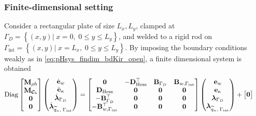 \subsubsection{Finite-dimensional setting}
Consider a rectangular plate of size $L_x, L_y$, clamped at $\Gamma_{D} = \left\{(x,y) \vert \;  x=0, \; 0 \le y \le L_y  \right\}$, and welded to a rigid rod on $\Gamma_{\text{int}} = \left\{ (x,y) \vert \;  x=L_x, \; 0 \le y \le L_y  \right\}$. By imposing the boundary conditions weakly as in \eqref{eq:pHsys_findim_bdKir_open}, a finite dimensional system is obtained
\begin{equation}\label{eq:pHsys_findim_intKir_open}
\begin{aligned}
\mathrm{Diag}
\begin{bmatrix}
\mathbf{M}_{\rho h}\\
\mathbf{M}_{\bm{\mathcal{C}}_b}\\
\mathbf{0}\\
\mathbf{0}\\
\end{bmatrix}
\begin{pmatrix}
\dot{\mathbf{e}}_{w} \\
\dot{\mathbf{e}}_{\kappa} \\
\dot{\bm{\lambda}}_{\Gamma_D} \\
\dot{\bm{\lambda}}_{\widetilde{q}_n, \; \Gamma_{\mathrm{int}}} \\
\end{pmatrix}
&= \begin{bmatrix}
\mathbf{0} & - \mathbf{D}_{\operatorname*{Hess}}^\top & \mathbf{B}_{\Gamma_D} & \mathbf{B}_{w, \Gamma_{\mathrm{int}}}\\
\mathbf{D}_{\operatorname*{Hess}} & \mathbf{0} & \mathbf{0} & \mathbf{0} \\
-\mathbf{B}_{\Gamma_D}^\top & \mathbf{0} & \mathbf{0} & \mathbf{0} \\
-\mathbf{B}_{w, \Gamma_{\mathrm{int}}}^\top & \mathbf{0} & \mathbf{0} & \mathbf{0} \\
\end{bmatrix} 
\begin{pmatrix}
{\mathbf{e}}_{w} \\
{\mathbf{e}}_{\kappa} \\
{\bm{\lambda}}_{\Gamma_D} \\
{\bm{\lambda}}_{\widetilde{q}_n, \; \Gamma_{\mathrm{int}}} \\
\end{pmatrix} + 
\begin{bmatrix}
\mathbf{0} \\

\end{bmatrix}
\end{aligned}
\end{equation}
